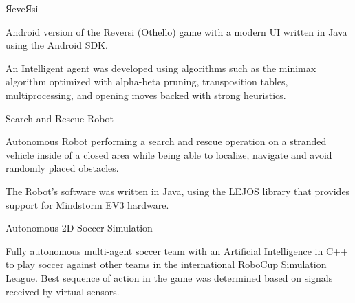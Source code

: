 
\begin{cventries}
  \cventry
    {} %
    {ЯeveЯsi} %
    {} %
    {} %
    {
      \begin{cvitems} %
        \item {Android version of the Reversi (Othello) game with a modern UI written in Java using the Android SDK.}
		\item {An Intelligent agent was developed using algorithms such as the minimax algorithm optimized with alpha-beta pruning, transposition tables, multiprocessing, and opening moves backed with strong heuristics.}
      \end{cvitems}
    }

  \cventry
    {} %
    {Search and Rescue Robot} %
    {} %
    {} %
    {
      \begin{cvitems} %
      	\item {Autonomous Robot performing a search and rescue operation on a stranded vehicle inside of a closed area while being able to localize, navigate and avoid randomly placed obstacles. }
		\item {The Robot’s software was written in Java, using the LEJOS library that provides support for Mindstorm EV3 hardware.}
      \end{cvitems}
    }
    
     \cventry
    {} %
    {Autonomous 2D Soccer Simulation} %
    {} %
    {} %
    {
      \begin{cvitems} %
      	\item {Fully autonomous multi-agent soccer team with an Artificial Intelligence in C++ to play soccer against other teams in the international RoboCup Simulation League. Best sequence of action in the game was determined based on signals received by virtual sensors.}
      \end{cvitems}
    }
\end{cventries}
